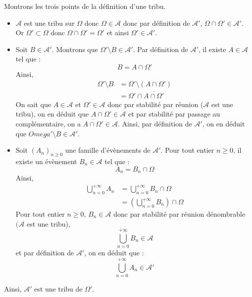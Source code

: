 \documentclass[a4paper,10pt]{report}
\begin{document}
\corr Montrons les trois points de la définition d'une tribu.

\begin{itemize}
\item $\mathcal{A}$ est une tribu sur $\Omega$ donc $\Omega \in \mathcal{A}$ donc par définition de $\mathcal{A}'$, $ \Omega \cap \Omega' \in \mathcal{A}'$. Or $\Omega' \subset \Omega$ donc $ \Omega \cap \Omega' = \Omega'$ et ainsi $\Omega' \in \mathcal{A}'$.
\item Soit $B \in \mathcal{A}'$. Montrons que $\Omega' \setminus B \in \mathcal{A}'$. Par définition de $\mathcal{A}'$, il existe $A \in \mathcal{A}$ tel que :
$$ B = A \cap \Omega'$$
Ainsi,
\begin{align*}
 \Omega' \setminus B&  = \Omega' \setminus  (A \cap \Omega') \\
& = \Omega' \cap \overline{A \cap \Omega'} 
\end{align*}
On sait que $A \in \mathcal{A}$ et $\Omega' \in \mathcal{A}$ donc par stabilité par réunion ($\mathcal{A}$ est une tribu), on en déduit que $A \cap \Omega' \in \mathcal{A}$ et par stabilité par passage au complémentaire, on a $\overline{A \cap \Omega'} \in \mathcal{A}$. Ainsi, par définition de $\mathcal{A}'$, on en déduit que $Omega' \setminus B \in \mathcal{A}'$.
\item Soit $(A_n)_{n \geq 0}$ une famille d'évènements de $\mathcal{A}'$. Pour tout entier $n \geq 0$, il existe un évènement $B_n \in \mathcal{A}$ tel que :
$$ A_n = B_n \cap \Omega$$
Ainsi,
\begin{align*}
\bigcup_{n=0}^{+ \infty} A_n & = \bigcup_{n=0}^{+ \infty}B_n \cap \Omega \\
& = \left( \bigcup_{n=0}^{+ \infty}B_n \right) \cap \Omega
\end{align*}
Pour tout entier $n \geq 0$, $B_n \in \mathcal{A}$ donc par stabilité par réunion dénombrable $(\mathcal{A}$ est une tribu),
$$  \bigcup_{n=0}^{+ \infty}B_n \in \mathcal{A}$$
et par définition de $\mathcal{A}'$, on en déduit que :
$$ \bigcup_{n=0}^{+ \infty} A_n \in \mathcal{A}'$$
\end{itemize}
Ainsi, $\mathcal{A}'$ est une tribu de $\Omega'$.
\end{document}
